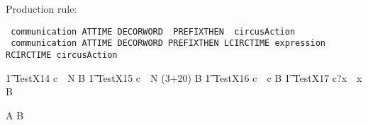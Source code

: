 Production rule:
\begin{verbatim}
 communication ATTIME DECORWORD  PREFIXTHEN  circusAction
 communication ATTIME DECORWORD PREFIXTHEN LCIRCTIME expression RCIRCTIME circusAction
\end{verbatim}

\begin{circusaction}
	\t1 TestX14 \circdef  c~\circat~N  B
	\also
	\t1 TestX15 \circdef  c~\circat~N \then (3+20) B
	\also
	\t1 TestX16 \circdef  c~\circat~c \then B
	\also
	\t1 TestX17 \circdef  c?x~\circat~x \then B
\end{circusaction}

\begin{circusaction}
   \circspot A \circseq B
\end{circusaction}

\begin{circus}
    \circend
\end{circus}
